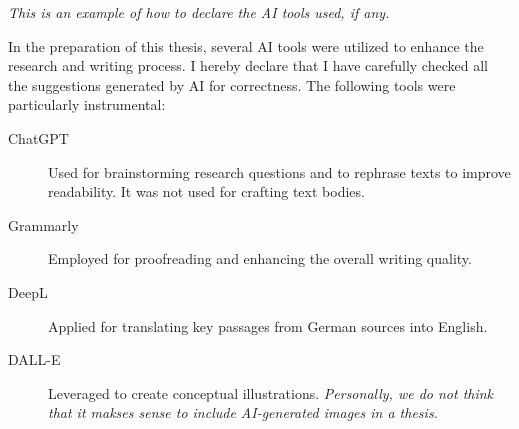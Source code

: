 \emph{This is an example of how to declare the AI tools used, if any.}

In the preparation of this thesis, several AI tools were utilized to enhance the research and writing process.
I hereby declare that I have carefully checked all the suggestions generated by AI for correctness.
The following tools were particularly instrumental:

\begin{description}
    \item[ChatGPT] Used for brainstorming research questions and to rephrase texts to improve readability. It was not used for crafting text bodies.
    \item[Grammarly] Employed for proofreading and enhancing the overall writing quality.
    \item[DeepL] Applied for translating key passages from German sources into English.
    \item[DALL-E] Leveraged to create conceptual illustrations. \emph{Personally, we do not think that it makses sense to include AI-generated images in a thesis.}
\end{description}

